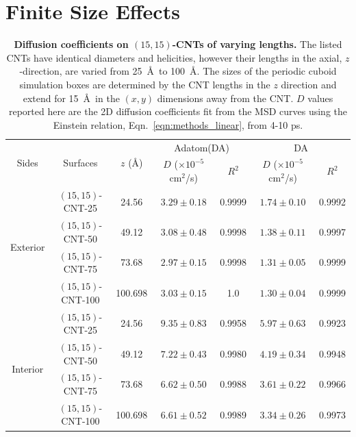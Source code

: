 \documentclass[journal=jpcbfk, layout=twocolumn, manuscript=article]{achemso}
\begin{document}
\section{Finite Size Effects}

\begin{table}[h]
    \footnotesize
    \centering
    \begin{tabular}{c|cc|cc|cc}
\hline
\multirow{2}{*}{Sides}		&	\multirow{2}{*}{Surfaces} 	&	\multirow{2}{*}{$z$ (\AA)}	&	\multicolumn{2}{c}{Adatom(DA)}			&	\multicolumn{2}{c}{DA} 					\\
																								\cline{4-7}
							&								&								&	$D$ ($\times10^{-5}$ cm$^2$/s) & $R^2$	&	$D$ ($\times10^{-5}$ cm$^2$/s) & $R^2$ 	\\
\hline
\multirow{4}{*}{Exterior}	&	$(15,15)$-CNT-25					&	24.56						&	$3.29	\pm	0.18$	&	0.9999          &   $1.74	\pm	0.10$	&	0.9992	\\
								\cline{2-7}
							&	$(15,15)$-CNT-50					&	49.12 						&   $3.08	\pm	0.48$	&	0.9998			&   $1.38	\pm	0.11$	&	0.9997	\\
								\cline{2-7}
							&	$(15,15)$-CNT-75 					& 	73.68						&   $2.97	\pm	0.15$	&	0.9998			&   $1.31	\pm	0.05$	&	0.9999	\\
								\cline{2-7}
							&	$(15,15)$-CNT-100 					& 	100.698						&   $3.03	\pm	0.15$	&	1.0				& 	$1.30	\pm	0.04$	&	0.9999	\\
\hline
\multirow{4}{*}{Interior}	&	$(15,15)$-CNT-25					&	24.56						&   $9.35	\pm	0.83$	&	0.9958			&   $5.97	\pm	0.63$	&	0.9923	\\
								\cline{2-7}
							&	$(15,15)$-CNT-50					&	49.12 						&   $7.22	\pm	0.43$	&	0.9980			&   $4.19	\pm	0.34$	&	0.9948	\\
								\cline{2-7}
							&	$(15,15)$-CNT-75 					& 	73.68						&   $6.62	\pm	0.50$	&	0.9988			&   $3.61	\pm	0.22$	&	0.9966	\\
								\cline{2-7}
							&	$(15,15)$-CNT-100 					& 	100.698						&   $6.61	\pm	0.52$	&	0.9989			&   $3.34	\pm	0.26$	&	0.9973	\\
\hline
    \end{tabular}
    \caption[Diffusion coefficients on $(15,15)$-CNT of Varying Lengths.]{\textbf{Diffusion coefficients on $(15,15)$-CNTs of varying lengths.} The listed CNTs have identical diameters and helicities, however their lengths in the axial, $z$-direction, are varied from 25~\AA\ to 100~\AA. The sizes of the periodic cuboid simulation boxes are determined by the CNT lengths in the $z$ direction and extend for 15~\AA\ in the $(x,y)$ dimensions away from the CNT. $D$ values reported here are the 2D diffusion coefficients fit from the MSD curves using the Einstein relation, Eqn.~\ref{eqn:methods_linear}, from 4-10 ps.
    }
    \label{tab:Tech_boxsize_CNT}
\end{table}
\end{document}
